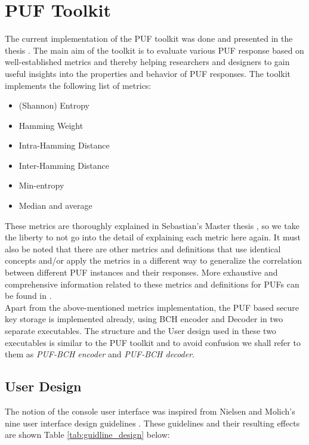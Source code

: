\section{PUF Toolkit}
The current implementation of the PUF toolkit was done and presented in the thesis \cite{71}. The main aim of the toolkit is to evaluate various PUF response based on well-established metrics and thereby helping researchers and designers to gain useful insights into the properties and behavior of PUF responses. The toolkit implements the following list of metrics:

\begin{itemize}
	\item (Shannon) Entropy
	\item Hamming Weight
	\item Intra-Hamming Distance
	\item Inter-Hamming Distance
	\item Min-entropy
	\item Median and average
\end{itemize}

These metrics are thoroughly explained in Sebastian's Master thesis \cite{71}, so we take the liberty to not go into the detail of explaining each metric here again. It must also be noted that there are other metrics and definitions that use identical concepts and/or apply the metrics in a different way to generalize the correlation between different PUF instances and their responses. More exhaustive and comprehensive information related to these metrics and definitions for PUFs can be found in \cite{60,64,24,61}.\\

Apart from the above-mentioned metrics implementation, the PUF based secure key storage is implemented already, using BCH encoder and Decoder in two separate executables. The structure and the User design used in these two executables is similar to the PUF toolkit and to avoid confusion we shall refer to them as \emph{PUF-BCH encoder} and \emph{PUF-BCH decoder}.\\

\subsection{User Design}

The notion of the console user interface was inspired from Nielsen and Molich's nine user interface design guidelines \cite{67}. These guidelines and their resulting effects are shown Table \ref{tab:guidline_design} below:

